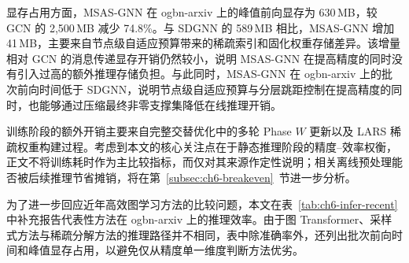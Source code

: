 显存占用方面，MSAS-GNN 在 ogbn-arxiv 上的峰值前向显存为 630\,MB，较 GCN 的 2,500\,MB 减少 74.8\%。与 SDGNN 的 589\,MB 相比，MSAS-GNN 增加 41\,MB，主要来自节点级自适应预算带来的稀疏索引和固化权重存储差异。该增量相对 GCN 的消息传递显存开销仍然较小，说明 MSAS-GNN 在提高精度的同时没有引入过高的额外推理存储负担。与此同时，MSAS-GNN 在 ogbn-arxiv 上的批次前向时间低于 SDGNN，说明节点级自适应预算与分层跳距控制在提高精度的同时，也能够通过压缩最终非零支撑集降低在线推理开销。

训练阶段的额外开销主要来自完整交替优化中的多轮 Phase $W$ 更新以及 LARS 稀疏权重构建过程。考虑到本文的核心关注点在于静态推理阶段的精度--效率权衡，正文不将训练耗时作为主比较指标，而仅对其来源作定性说明；相关离线预处理能否被后续推理节省摊销，将在第~\ref{subsec:ch6-breakeven}~节进一步分析。

为了进一步回应近年高效图学习方法的比较问题，本文在表~\ref{tab:ch6-infer-recent} 中补充报告代表性方法在 ogbn-arxiv 上的推理效率。由于图 Transformer、采样式方法与稀疏分解方法的推理路径并不相同，表中除准确率外，还列出批次前向时间和峰值显存占用，以避免仅从精度单一维度判断方法优劣。

